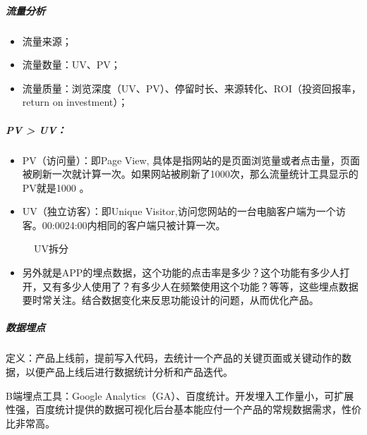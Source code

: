 \documentclass[letterpaper,10pt,english]{sphinxmanual}
\begin{document}
\subparagraph{流量分析}
\label{\detokenize{chapter_knowledge/data_analysis:id12}}\begin{itemize}
\item {} 
流量来源；

\item {} 
流量数量：UV、PV；

\item {} 
流量质量：浏览深度（UV、PV）、停留时长、来源转化、ROI（投资回报率，return
on investment）；

\end{itemize}


\subparagraph{PV > UV：}
\label{\detokenize{chapter_knowledge/data_analysis:pv-uv}}\begin{itemize}
\item {} 
PV（访问量）：即Page View,
具体是指网站的是页面浏览量或者点击量，页面被刷新一次就计算一次。如果网站被刷新了1000次，那么流量统计工具显示的PV就是1000
。

\item {} 
UV（独立访客）：即Unique
Visitor,访问您网站的一台电脑客户端为一个访客。00:00\sphinxhyphen{}24:00内相同的客户端只被计算一次。

\end{itemize}

\begin{figure}[H]
\centering
\capstart

\noindent{}
\caption{UV拆分}\label{\detokenize{chapter_knowledge/data_analysis:id23}}\end{figure}
\begin{itemize}
\item {} 
另外就是APP的埋点数据，这个功能的点击率是多少？这个功能有多少人打开，又有多少人使用了？有多少人在频繁使用这个功能？等等，这些埋点数据要时常关注。结合数据变化来反思功能设计的问题，从而优化产品。

\end{itemize}


\subparagraph{数据埋点}
\label{\detokenize{chapter_knowledge/data_analysis:id13}}
定义：产品上线前，提前写入代码，去统计一个产品的关键页面或关键动作的数据，以便产品上线后进行数据统计分析和产品迭代。%
\begin{footnote}[669]\sphinxAtStartFootnote
{}
%
\end{footnote}

B端埋点工具：Google
Analytics（GA）、百度统计。开发埋入工作量小，可扩展性强，百度统计提供的数据可视化后台基本能应付一个产品的常规数据需求，性价比非常高。
\end{document}
